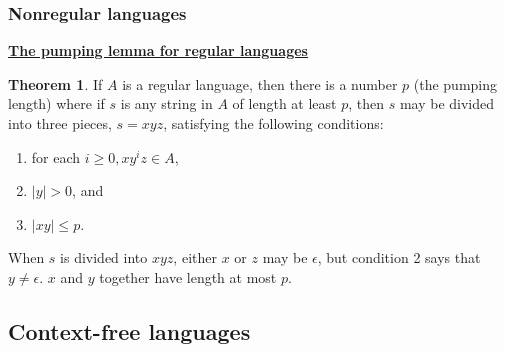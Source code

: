 \documentclass[11pt]{article}
\theoremstyle{definition}
\newtheorem{thm}{Theorem}[section]
\begin{document}
\subsubsection{Nonregular languages}
\textbf{\underline{The pumping lemma for regular languages}}
\begin{thm}
    If $A$ is a regular language, then there is a number $p$ (the pumping length) where if $s$ is any string in $A$ of length at least $p$, then $s$ may be divided into three pieces, $s = xyz$, satisfying the following conditions:
    \begin{enumerate}
        \item for each $i\geq 0, xy^iz\in A$,
        \item $|y|>0$, and
        \item $|xy| \leq p$.
    \end{enumerate}
When $s$ is divided into $xyz$, either $x$ or $z$ may be $\epsilon$, but condition 2 says that $y \neq \epsilon$. $x$ and $y$ together have length at most $p$.
\end{thm}

\subsection{Context-free languages}
\end{document}

